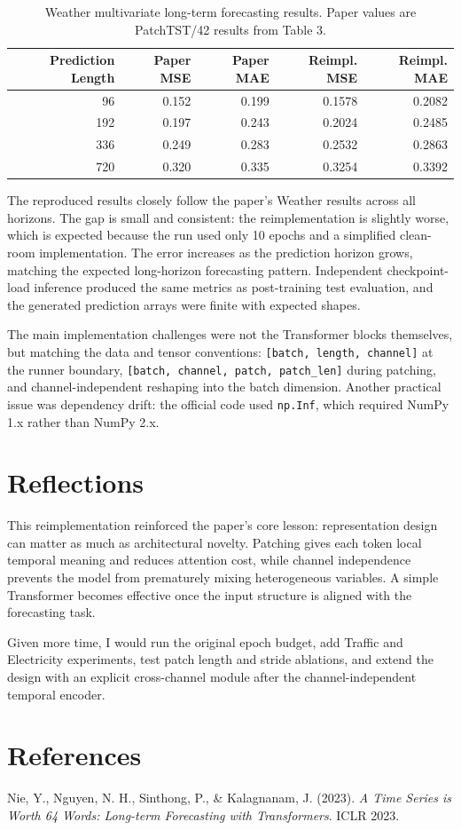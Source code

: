 \documentclass[11pt]{article}
\begin{document}
\begin{table}[h]
\centering
\small
\begin{tabular}{rrrrr}
\toprule
Prediction Length & Paper MSE & Paper MAE & Reimpl. MSE & Reimpl. MAE \\
\midrule
96  & 0.152 & 0.199 & 0.1578 & 0.2082 \\
192 & 0.197 & 0.243 & 0.2024 & 0.2485 \\
336 & 0.249 & 0.283 & 0.2532 & 0.2863 \\
720 & 0.320 & 0.335 & 0.3254 & 0.3392 \\
\bottomrule
\end{tabular}
\caption{Weather multivariate long-term forecasting results. Paper values are PatchTST/42 results from Table 3.}
\end{table}

The reproduced results closely follow the paper's Weather results across all horizons. The gap is small and consistent: the reimplementation is slightly worse, which is expected because the run used only 10 epochs and a simplified clean-room implementation. The error increases as the prediction horizon grows, matching the expected long-horizon forecasting pattern. Independent checkpoint-load inference produced the same metrics as post-training test evaluation, and the generated prediction arrays were finite with expected shapes.

The main implementation challenges were not the Transformer blocks themselves, but matching the data and tensor conventions: \texttt{[batch, length, channel]} at the runner boundary, \texttt{[batch, channel, patch, patch\_len]} during patching, and channel-independent reshaping into the batch dimension. Another practical issue was dependency drift: the official code used \texttt{np.Inf}, which required NumPy 1.x rather than NumPy 2.x.

\section{Reflections}

This reimplementation reinforced the paper's core lesson: representation design can matter as much as architectural novelty. Patching gives each token local temporal meaning and reduces attention cost, while channel independence prevents the model from prematurely mixing heterogeneous variables. A simple Transformer becomes effective once the input structure is aligned with the forecasting task.

Given more time, I would run the original epoch budget, add Traffic and Electricity experiments, test patch length and stride ablations, and extend the design with an explicit cross-channel module after the channel-independent temporal encoder.

\section{References}

Nie, Y., Nguyen, N. H., Sinthong, P., \& Kalagnanam, J. (2023). \textit{A Time Series is Worth 64 Words: Long-term Forecasting with Transformers}. ICLR 2023.
\end{document}
